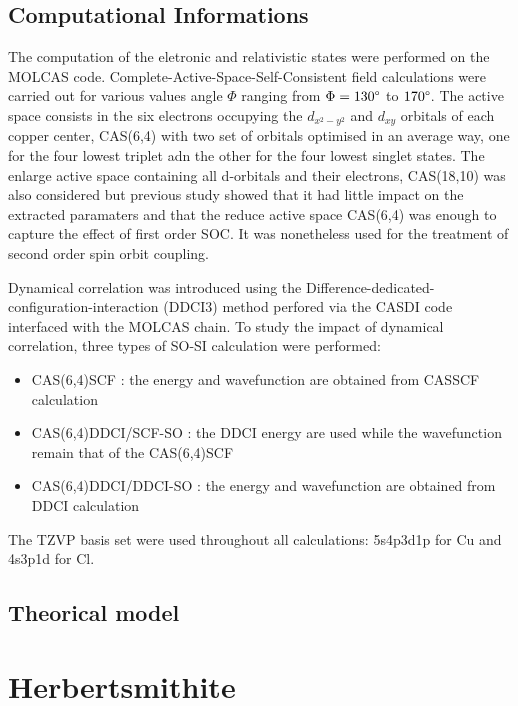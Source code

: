 \documentclass[10pt]{report}
\numberwithin{equation}{section}
\begin{document}
\section{Computational Informations}

The computation of the eletronic and relativistic states were performed on the MOLCAS code.
Complete-Active-Space-Self-Consistent field calculations were carried out for various values angle $\Phi$ ranging from $\Phi=130\degree$ to $170\degree$.
The active space consists in the six electrons occupying the $d_{x^2-y^2}$ and $d_{xy}$ orbitals of each copper center, CAS(6,4) with two set of orbitals optimised in an average way, one for the four lowest triplet adn the other for the four lowest singlet states.
The enlarge active space containing all d-orbitals and their electrons, CAS(18,10) was also considered but previous study showed that it had little impact on the extracted paramaters and that the reduce active space CAS(6,4) was enough to capture the effect of first order SOC.
It was nonetheless used for the treatment of second order spin orbit coupling.

Dynamical correlation was introduced using the Difference-dedicated-configuration-interaction (DDCI3) method perfored via the CASDI code interfaced with the MOLCAS chain.
To study the impact of dynamical correlation, three types of SO-SI calculation were performed:
\begin{itemize}
    \item CAS(6,4)SCF : the energy and wavefunction are obtained from CASSCF calculation
    \item CAS(6,4)DDCI/SCF-SO : the DDCI energy are used while the wavefunction remain that of the CAS(6,4)SCF
    \item CAS(6,4)DDCI/DDCI-SO : the energy and wavefunction are obtained from DDCI calculation
\end{itemize}

The TZVP basis set were used throughout all calculations: 5s4p3d1p for Cu and 4s3p1d for Cl.

\section{Theorical model}



\chapter{Herbertsmithite}
\end{document}
